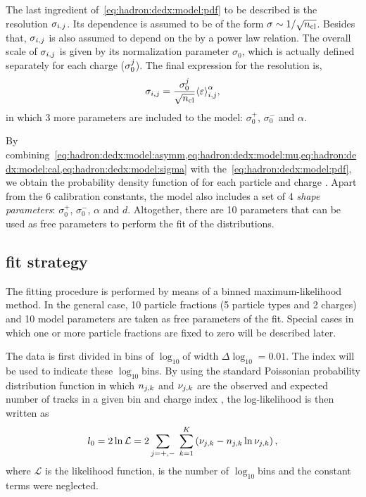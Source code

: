 The last ingredient of~\cref{eq:hadron:dedx:model:pdf}
to be described is the resolution $\sigma_{i,j}$. 
Its \ncl dependence is assumed to be of the form
$\sigma \sim 1/\sqrt{\mbox{$n_{\text{cl}}$}}$. Besides that, $\sigma_{i,j}$
is also assumed to depend on the \meaneps by a power law relation.
The overall scale of $\sigma_{i,j}$ is given by its normalization
parameter $\sigma_0$, which is actually defined separately for each charge ($\sigma_0^{j}$).
The final expression for the resolution is,
\begin{equation}
  \sigma_{i,j} = \frac{\sigma_0^{j}}{\sqrt{\mbox{$n_{\text{cl}}$}}} \mbox{$\langle\varepsilon\rangle$}_{i,j}^{\alpha},
  \label{eq:hadron:dedx:model:sigma}
\end{equation}
in which 3 more parameters are included to the model: $\sigma_0^+$, $\sigma_0^-$ and $\alpha$. 

By combining~\cref{eq:hadron:dedx:model:asymm,eq:hadron:dedx:model:mu,eq:hadron:dedx:model:cal,eq:hadron:dedx:model:sigma}
with the~\cref{eq:hadron:dedx:model:pdf}, we obtain the probability density
function of \eps for each particle \ipart and charge \ich.
Apart from the 6 calibration constants,
the model also includes a set of 4 \textit{shape parameters}: $\sigma_0^+$, $\sigma_0^-$, $\alpha$ and $d$.
Altogether, there are 10 parameters that can be used as free parameters
to perform the fit of the \eps distributions.


\subsection[\dedx fit strategy]{\boldmath \dedx fit strategy}
\label{sec:hadron:dedx:fit}

The fitting procedure is performed by means of a binned maximum-likelihood method.
In the general case, 10 particle fractions (5 particle types and 2 charges) and
10 model parameters are taken as free parameters of the fit. Special cases
in which one or more particle fractions are fixed to zero will be described later.

The \eps data is first divided in bins of $\log_{10}$\eps of width $\Delta\log_{10}$\eps$=0.01$.
The index \ieps will be used to indicate these $\log_{10}$\eps bins.
By using the standard Poissonian probability distribution function in which
$n_{j,k}$ and $\nu_{j,k}$ are the observed and expected
number of tracks in a given bin \ieps and charge index \ich,
the log-likelihood is then written as
\begin{equation}
  l_0 = 2\ln \mathcal{L} = 2\sum_{j=+,-}\;\sum_{k=1}^{K} \left(\nu_{j,k} - n_{j,k}\ln\nu_{j,k}\right), 
  \label{eq:hadron:dedx:fit:l0}
\end{equation}
where $\mathcal{L}$ is the likelihood function, \neps is the number of $\log_{10}$\eps bins and the constant terms were neglected.


